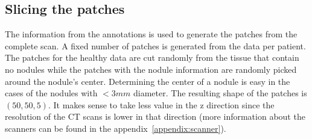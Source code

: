 \documentclass[../Thesis.tex]{subfiles}
\begin{document}
\subsection{Slicing the patches}
The information from the annotations is used to generate the patches from the complete scan. A fixed number of patches is generated from the data per patient. The patches for the healthy data are cut randomly from the tissue that contain no nodules while the patches with the nodule information are randomly picked around the nodule's center. Determining the center of a nodule is easy in the cases of the nodules with $<3mm$ diameter. The resulting shape of the patches is $(50,50,5)$. It makes sense to take less value in the z direction since the resolution of the CT scans is lower in that direction (more information about the scanners can be found in the appendix~\ref{appendix:scanner}).
\end{document}

